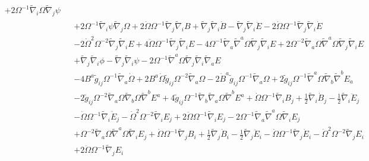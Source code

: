 \documentclass[10pt,letterpaper]{article}
\numberwithin{equation}{section}
\begin{document}
\begin{eqnarray}
+ 2 \Omega^{-1} \tilde{\nabla}_{i}\Omega \tilde{\nabla}_{j}\psi\nonumber\\
&& + 2 \Omega^{-1} \tilde{\nabla}_{i}\psi \tilde{\nabla}_{j}\Omega
+ 2 \dot{\Omega} \Omega^{-1} \tilde{\nabla}_{j}\tilde{\nabla}_{i}B
+ \tilde{\nabla}_{j}\tilde{\nabla}_{i}\dot{B}
-  \tilde{\nabla}_{j}\tilde{\nabla}_{i}\ddot{E}
- 2 \dot{\Omega} \Omega^{-1} \tilde{\nabla}_{j}\tilde{\nabla}_{i}\dot{E}\nonumber\\
&& - 2 \dot{\Omega}^2 \Omega^{-2} \tilde{\nabla}_{j}\tilde{\nabla}_{i}E
+ 4 \ddot{\Omega} \Omega^{-1} \tilde{\nabla}_{j}\tilde{\nabla}_{i}E
- 4 \Omega^{-1} \tilde{\nabla}_{a}\tilde{\nabla}^{a}\Omega \tilde{\nabla}_{j}\tilde{\nabla}_{i}E
+ 2 \Omega^{-2} \tilde{\nabla}_{a}\Omega \tilde{\nabla}^{a}\Omega \tilde{\nabla}_{j}\tilde{\nabla}_{i}E\nonumber\\
&& + \tilde{\nabla}_{j}\tilde{\nabla}_{i}\phi
-  \tilde{\nabla}_{j}\tilde{\nabla}_{i}\psi
- 2 \Omega^{-1} \tilde{\nabla}^{a}\Omega \tilde{\nabla}_{j}\tilde{\nabla}_{i}\tilde{\nabla}_{a}E
\nonumber\\
&&-4 B^{a} \tilde{g}_{ij} \Omega^{-1} \tilde{\nabla}_{a}\dot{\Omega}
+ 2 B^{a} \dot{\Omega} \tilde{g}_{ij} \Omega^{-2} \tilde{\nabla}_{a}\Omega
- 2 \dot{B}^{a} \tilde{g}_{ij} \Omega^{-1} \tilde{\nabla}_{a}\Omega
+ 2 \tilde{g}_{ij} \Omega^{-1} \tilde{\nabla}^{a}\Omega \tilde{\nabla}_{b}\tilde{\nabla}^{b}E_{a}\nonumber\\
&& - 2 \tilde{g}_{ij} \Omega^{-2} \tilde{\nabla}_{a}\Omega \tilde{\nabla}_{b}\Omega \tilde{\nabla}^{b}E^{a}
+ 4 \tilde{g}_{ij} \Omega^{-1} \tilde{\nabla}_{b}\tilde{\nabla}_{a}\Omega \tilde{\nabla}^{b}E^{a}
+ \dot{\Omega} \Omega^{-1} \tilde{\nabla}_{i}B_{j}
+ \tfrac{1}{2} \tilde{\nabla}_{i}\dot{B}_{j}
-  \tfrac{1}{2} \tilde{\nabla}_{i}\ddot{E}_{j}\nonumber\\
&& -  \dot{\Omega} \Omega^{-1} \tilde{\nabla}_{i}\dot{E}_{j}
-  \dot{\Omega}^2 \Omega^{-2} \tilde{\nabla}_{i}E_{j}
+ 2 \ddot{\Omega} \Omega^{-1} \tilde{\nabla}_{i}E_{j}
- 2 \Omega^{-1} \tilde{\nabla}_{a}\tilde{\nabla}^{a}\Omega \tilde{\nabla}_{i}E_{j}\nonumber\\
&& + \Omega^{-2} \tilde{\nabla}_{a}\Omega \tilde{\nabla}^{a}\Omega \tilde{\nabla}_{i}E_{j}
+ \dot{\Omega} \Omega^{-1} \tilde{\nabla}_{j}B_{i}
+ \tfrac{1}{2} \tilde{\nabla}_{j}\dot{B}_{i}
-  \tfrac{1}{2} \tilde{\nabla}_{j}\ddot{E}_{i}
-  \dot{\Omega} \Omega^{-1} \tilde{\nabla}_{j}\dot{E}_{i}
-  \dot{\Omega}^2 \Omega^{-2} \tilde{\nabla}_{j}E_{i}\nonumber\\
&& + 2 \ddot{\Omega} \Omega^{-1} \tilde{\nabla}_{j}E_{i}

\end{eqnarray}
\end{document}

